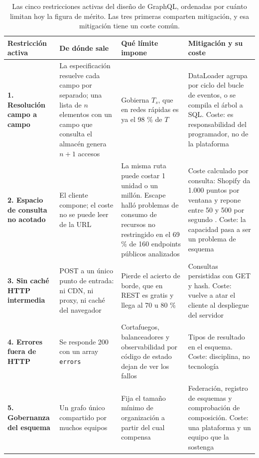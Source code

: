\documentclass[11pt,letterpaper]{article}
\begin{document}
\begin{table}[t]
\small
\caption{Las cinco restricciones activas del diseño de GraphQL, ordenadas por
cuánto limitan hoy la figura de mérito. Las tres primeras comparten mitigación,
y esa mitigación tiene un coste común.}
\label{cuadro:restricciones}
\begin{tabularx}{\textwidth}{@{}p{3.3cm}XXp{3.3cm}@{}}
\toprule
\textbf{Restricción activa} & \textbf{De dónde sale} &
\textbf{Qué límite impone} & \textbf{Mitigación y su coste} \\
\midrule
\textbf{1. Resolución campo a campo}
& La especificación resuelve cada campo por separado; una lista de $n$
  elementos con un campo que consulta el almacén genera $n+1$ accesos
& Gobierna $T_{s}$, que en redes rápidas es ya el 98 \% de $T$
& DataLoader agrupa por ciclo del bucle de eventos, o se compila el árbol a
  SQL. Coste: es responsabilidad del programador, no de la plataforma \\
\addlinespace[2pt]
\textbf{2. Espacio de consulta no acotado}
& El cliente compone; el coste no se puede leer de la URL
& La misma ruta puede costar 1 unidad o un millón. Escape halló problemas de
  consumo de recursos no restringido en el 69 \% de 160 endpoints públicos
  analizados \parencite{escape2024}
& Coste calculado por consulta: Shopify da 1.000 puntos por ventana y repone
  entre 50 y 500 por segundo \parencite{shopifylimites}. Coste: la capacidad
  pasa a ser un problema de esquema \\
\addlinespace[2pt]
\textbf{3. Sin caché HTTP intermedia}
& POST a un único punto de entrada: ni CDN, ni proxy, ni caché del navegador
& Pierde el acierto de borde, que en REST es gratis y llega al 70 u 80 \%
& Consultas persistidas con GET y hash. Coste: vuelve a atar el cliente al
  despliegue del servidor \\
\addlinespace[2pt]
\textbf{4. Errores fuera de HTTP}
& Se responde 200 con un array \texttt{errors}
& Cortafuegos, balanceadores y observabilidad por código de estado dejan de
  ver los fallos
& Tipos de resultado en el esquema. Coste: disciplina, no tecnología \\
\addlinespace[2pt]
\textbf{5. Gobernanza del esquema}
& Un grafo único compartido por muchos equipos
& Fija el tamaño mínimo de organización a partir del cual compensa
& Federación, registro de esquemas y comprobación de composición. Coste:
  una plataforma y un equipo que la sostenga \\
\bottomrule
\end{tabularx}
\end{table}
\end{document}

